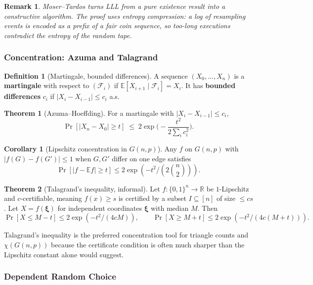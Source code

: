 \documentclass{article}
\newtheorem{remark}{Remark}
\theoremstyle{definition}
\newtheorem{theorem}{Theorem}
\newtheorem{corollary}{Corollary}
\newtheorem{definition}{Definition}
\begin{document}
\begin{remark}
Moser--Tardos turns LLL from a pure existence result into a
constructive algorithm. The proof uses \emph{entropy compression}:
a log of resampling events is encoded as a prefix of a fair coin
sequence, so too-long executions contradict the entropy of the
random tape.
\end{remark}

\subsubsection{Concentration: Azuma and Talagrand}

\begin{definition}[Martingale, bounded differences]
A sequence $(X_0, \dots, X_n)$ is a \textbf{martingale} with respect
to $(\mathcal F_i)$ if $\mathbb{E}[X_{i + 1} \mid \mathcal F_i] = X_i$.
It has \textbf{bounded differences} $c_i$ if $|X_i - X_{i - 1}| \le c_i$
a.s.
\end{definition}

\begin{theorem}[Azuma--Hoeffding]\label{thm:azuma}
For a martingale with $|X_i - X_{i - 1}| \le c_i$,
\[
  \Pr[|X_n - X_0| \ge t]
  \;\le\; 2 \exp\!\Big(-\frac{t^2}{2 \sum_i c_i^2}\Big).
\]
\end{theorem}

\begin{corollary}[Lipschitz concentration in $G(n, p)$]
Any $f$ on $G(n, p)$ with $|f(G) - f(G')| \le 1$ when $G, G'$ differ
on one edge satisfies
\[
  \Pr[|f - \mathbb{E} f| \ge t] \le 2\exp(-t^2/(2\binom{n}{2})).
\]
\end{corollary}

\begin{theorem}[Talagrand's inequality, informal]
Let $f : \{0, 1\}^n \to \mathbb{R}$ be $1$-Lipschitz and $c$-certifiable,
meaning $f(x) \ge s$ is certified by a subset $I \subseteq [n]$ of
size $\le cs$. Let $X = f(\boldsymbol{\xi})$ for independent coordinates
$\boldsymbol{\xi}$ with median $M$. Then
\[
  \Pr[X \le M - t] \le 2\exp(-t^2/(4cM)),
  \qquad
  \Pr[X \ge M + t] \le 2\exp(-t^2/(4c(M + t))).
\]
\end{theorem}

Talagrand's inequality is the preferred concentration tool for
triangle counts and $\chi(G(n, p))$ because the certificate condition
is often much sharper than the Lipschitz constant alone would suggest.

\subsubsection{Dependent Random Choice}
\end{document}

